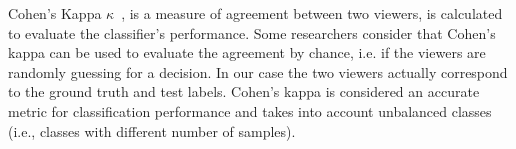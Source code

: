 Cohen's Kappa $\kappa$~\cite{uebersax1987diversity}, is a measure of agreement between two viewers, is calculated to evaluate the classifier's performance. Some researchers consider that Cohen's kappa can be used to evaluate the agreement by chance, i.e. if the viewers are randomly guessing for a decision. In our case the two viewers actually correspond to the ground truth and test labels. Cohen's kappa is considered an accurate metric for classification performance and takes into account unbalanced classes (i.e., classes with different number of samples). 

